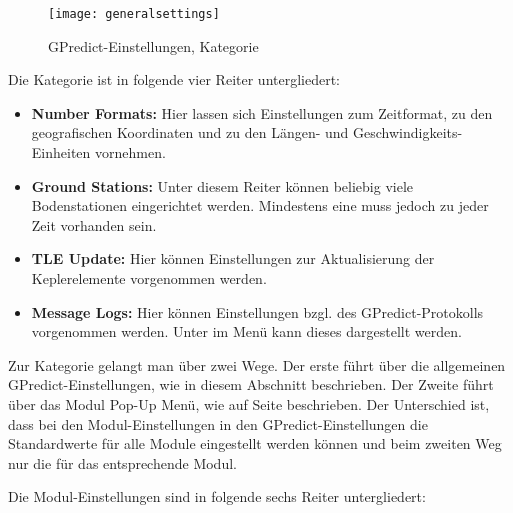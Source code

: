 \begin{figure}[h]
	\centering
	\texttt{[image: generalsettings]}
	\caption{GPredict-Einstellungen, Kategorie }
	\label{fig:generalsettings} 
\end{figure}

Die Kategorie  ist in folgende vier Reiter untergliedert:

\begin{itemize}
	\parskip0pt
	\item \textbf{Number Formats:} Hier lassen sich Einstellungen zum Zeitformat, zu den geografischen Koordinaten und zu den Längen- und Geschwindigkeits-Einheiten vornehmen.
	\item \textbf{Ground Stations:} Unter diesem Reiter können beliebig viele Bodenstationen eingerichtet werden. Mindestens eine muss jedoch zu jeder Zeit vorhanden sein.
	\item \textbf{TLE Update:} Hier können Einstellungen zur Aktualisierung der Keplerelemente vorgenommen werden.
	\item \textbf{Message Logs:} Hier können Einstellungen bzgl. des GPredict-Protokolls vorgenommen werden. Unter  im Menü  kann dieses dargestellt werden.
\end{itemize}

Zur Kategorie  gelangt man über zwei Wege. Der erste führt über die allgemeinen GPredict-Einstellungen, wie in diesem Abschnitt beschrieben. Der Zweite führt über das Modul Pop-Up Menü, wie auf Seite \pageref{modulesettingsspecific} beschrieben. Der Unterschied ist, dass bei den Modul-Einstellungen in den GPredict-Einstellungen die Standardwerte für alle Module eingestellt werden können und beim zweiten Weg nur die für das entsprechende Modul.

\iffalse
\begin{figure}[h]
	\centering
	\texttt{[image: modulesettings]}
	\caption{GPredict-Einstellungen, Kategorie \myemph{Modules}}
	\label{fig:modulesettings} 
\end{figure}
\fi
Die Modul-Einstellungen sind in folgende sechs Reiter untergliedert:

